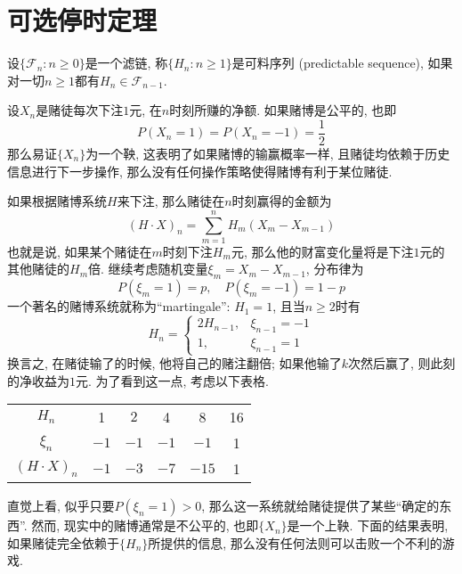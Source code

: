 \documentclass[cn, 12pt, math=mtpro2, bibstyle=apa, blue, twocol]{elegantbook}
\newcommand{\F}{\mathcal{F}}
\begin{document}
\section{可选停时定理}
\begin{definition}
设$\{\F_n:n\ge0\}$是一个滤链, 称$\{H_n:n\ge1\}$是可料序列 (predictable sequence), 如果对一切$n\ge1$都有$H_n\in\F_{n-1}$.
\end{definition}

\begin{example}\label{exp:exp4.2}
设$X_n$是赌徒每次下注$1$元, 在$n$时刻所赚的净额. 如果赌博是公平的, 也即
$$P(X_n=1)=P(X_n=-1)=\frac{1}{2}$$
那么易证$\{X_n\}$为一个鞅, 这表明了如果赌博的输赢概率一样, 且赌徒均依赖于历史信息进行下一步操作, 那么没有任何操作策略使得赌博有利于某位赌徒.

如果根据赌博系统$H$来下注, 那么赌徒在$n$时刻赢得的金额为
$$(H\cdot X)_n=\sum_{m=1}^{n}H_m(X_m-X_{m-1})$$
也就是说, 如果某个赌徒在$m$时刻下注$H_m$元, 那么他的财富变化量将是下注$1$元的其他赌徒的$H_m$倍. 继续考虑随机变量$\xi_m=X_m-X_{m-1}$, 分布律为
$$P(\xi_m=1)=p,\quad P(\xi_m=-1)=1-p$$
一个著名的赌博系统就称为“martingale”: $H_1=1$, 且当$n\ge2$时有
$$H_n=\begin{cases}
        2H_{n-1}, & \xi_{n-1}=-1 \\
        1, & \xi_{n-1}=1
      \end{cases}$$
换言之, 在赌徒输了的时候, 他将自己的赌注翻倍; 如果他输了$k$次然后赢了, 则此刻的净收益为$1$元. 为了看到这一点, 考虑以下表格.

\begin{table}
\centering
\begin{tabular}{cccccc}
$H_n$      & 1      & $2$      & 4      & 8 & 16      \\
$\xi_n$ & $-1$ & $-1$ & $-1$ & $-1$ & 1 \\
$(H\cdot X)_n$   & $-1$ & $-3$ & $-7$ & $-15$ & 1
\end{tabular}
\end{table}


直觉上看, 似乎只要$P(\xi_n=1)>0$, 那么这一系统就给赌徒提供了某些“确定的东西”. 然而, 现实中的赌博通常是不公平的, 也即$\{X_n\}$是一个上鞅. 下面的结果表明, 如果赌徒完全依赖于$\{H_n\}$所提供的信息, 那么没有任何法则可以击败一个不利的游戏.
\end{example}
\end{document}
